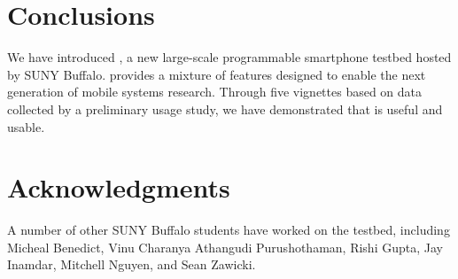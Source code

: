\section{Conclusions}
\label{sec-conclusions}

We have introduced \PhoneLab{}, a new large-scale programmable smartphone
testbed hosted by SUNY Buffalo. \PhoneLab{} provides a mixture of features
designed to enable the next generation of mobile systems research. Through
five vignettes based on data collected by a preliminary usage study, we have
demonstrated that \PhoneLab{} is useful and usable.

\section*{Acknowledgments}

A number of other SUNY Buffalo students have worked on the \PhoneLab{}
testbed, including Micheal Benedict, Vinu Charanya Athangudi Purushothaman,
Rishi Gupta, Jay Inamdar, Mitchell Nguyen, and Sean Zawicki.
